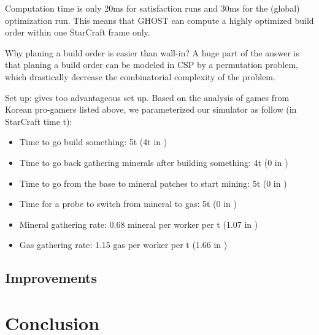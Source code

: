 \documentclass[journal]{IEEEtran}
\newcommand{\csp}{\textsc{CSP}\xspace}
\newcommand{\ghost}{\textsc{GHOST}\xspace}
\begin{document}
Computation time is  only 20ms for satisfaction runs and  30ms for the
(global) optimization run. This means that \ghost can compute a highly
optimized build order within one StarCraft frame only.

Why planing a build  order is easier than wall-in? A  huge part of the
answer is  that planing  a build  order can  be modeled  in \csp  by a
permutation  problem,  which  drastically decrease  the  combinatorial
complexity of the problem.

Set up:  \cite{ChurchillB11} gives too  advantageous set up.  Based on
the  analysis  of  games  from  Korean  pro-gamers  listed  above,  we
parameterized our simulator as follow (in StarCraft time t):
\begin{itemize}
\item Time to go build something: 5t (4t in \cite{ChurchillB11})
\item Time to go back  gathering minerals after building something: 4t
  (0 in \cite{ChurchillB11})
\item Time to go from the base  to mineral patches to start mining: 5t
  (0 in \cite{ChurchillB11})
\item  Time for  a probe  to  switch from  mineral  to gas:  5t (0  in
  \cite{ChurchillB11})
\item Mineral gathering  rate: 0.68 mineral per worker per  t (1.07 in
  \cite{ChurchillB11})
\item  Gas  gathering  rate:  1.15  gas per  worker  per  t  (1.66  in
  \cite{ChurchillB11})
\end{itemize}  

\subsection{Improvements}


\section{Conclusion}\label{sec:conclusion}








\ifCLASSOPTIONcaptionsoff
  \newpage
\fi
\end{document}
